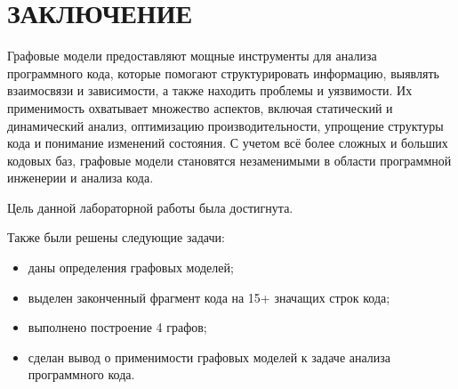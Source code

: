 \chapter*{\hfill{\centering  ЗАКЛЮЧЕНИЕ}\hfill}
Графовые модели предоставляют мощные инструменты для анализа программного кода, которые помогают структурировать информацию, выявлять взаимосвязи и зависимости, а также находить проблемы и уязвимости. 
Их применимость охватывает множество аспектов, включая статический и динамический анализ, оптимизацию производительности, упрощение структуры кода и понимание изменений состояния. 
С учетом всё более сложных и больших кодовых баз, графовые модели становятся незаменимыми в области программной инженерии и анализа кода.

Цель данной лабораторной работы была достигнута.

Также были решены следующие задачи:
\begin{itemize}
	\item даны определения графовых моделей;
	\item выделен законченный фрагмент кода на 15+ значащих строк кода;
	\item выполнено построение 4 графов;
	\item сделан вывод о применимости графовых моделей к задаче анализа программного кода.
\end{itemize}